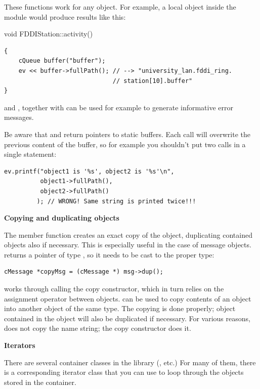 These functions work for any object. For example, a local object 
inside the module would produce results like this:


void FDDIStation::activity()


\begin{Verbatim}
{ 
    cQueue buffer("buffer");
    ev << buffer->fullPath(); // --> "university_lan.fddi_ring.
                              // station[10].buffer"
}
\end{Verbatim}



 and , together with
 can be used for example to generate informative
error messages.

Be aware that  and  return
pointers to static buffers. Each call will overwrite the previous
content of the buffer, so for example you shouldn't put two calls in a
single  statement:

\begin{Verbatim}
ev.printf("object1 is '%s', object2 is '%s'\n", 
          object1->fullPath(), 
          object2->fullPath()
         ); // WRONG! Same string is printed twice!!!
\end{Verbatim}


\textbf{Copying and duplicating objects}


The  member function creates an exact copy of the
object, duplicating
contained objects also if necessary. This is especially useful in the
case of message objects.  returns a pointer of type
, so it needs to be cast to the proper type:

\begin{Verbatim}
cMessage *copyMsg = (cMessage *) msg->dup();
\end{Verbatim}


 works through calling the copy constructor, which in
turn relies on the assignment operator between objects.
 can be used to copy contents of an object into
another object of the same type. The copying is done properly; object
contained in the object will also be duplicated if necessary. For
various reasons,  does not copy the name string;
the copy constructor does it.


\textbf{Iterators}


There are several container classes in the library (,
 etc.) For many of them, there is a corresponding
iterator class that you can use to loop through the objects stored in
the container.

